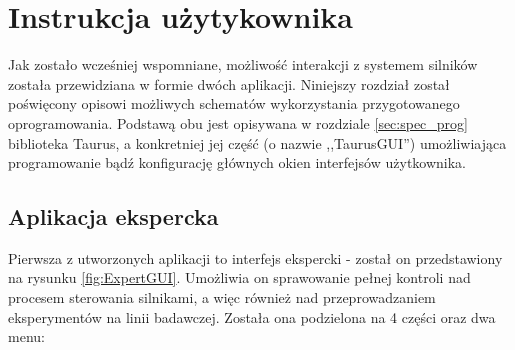 \clearpage
\section{Instrukcja użytykownika}
\label{sec:manual}

\quad Jak zostało wcześniej wspomniane, możliwość interakcji z systemem silników została przewidziana w formie dwóch aplikacji. Niniejszy rozdział został poświęcony opisowi możliwych schematów wykorzystania przygotowanego oprogramowania. Podstawą obu jest opisywana w rozdziale \ref{sec:spec_prog} biblioteka Taurus, a konkretniej jej część (o nazwie ,,TaurusGUI'') umożliwiająca programowanie bądź konfigurację głównych okien interfejsów użytkownika.

\subsection{Aplikacja ekspercka}
\label{sub:expertgui}

\quad Pierwsza z utworzonych aplikacji to interfejs ekspercki - został on przedstawiony na rysunku \ref{fig:ExpertGUI}. Umożliwia on sprawowanie pełnej kontroli nad procesem sterowania silnikami, a więc również nad przeprowadzaniem eksperymentów na linii badawczej. Została ona podzielona na 4 części oraz dwa menu:

